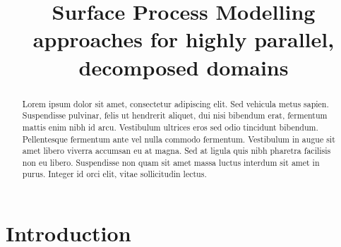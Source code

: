 \documentclass[draft,jgrga]{agu_template/AGUTeX}
\begin{document}

\title{Surface Process Modelling approaches for highly parallel, decomposed domains}











\begin{abstract}

Lorem ipsum dolor sit amet, consectetur adipiscing elit. Sed vehicula metus sapien. Suspendisse pulvinar, felis ut hendrerit aliquet, dui nisi bibendum erat, fermentum mattis enim nibh id arcu. Vestibulum ultrices eros sed odio tincidunt bibendum. Pellentesque fermentum ante vel nulla commodo fermentum. Vestibulum in augue sit amet libero viverra accumsan eu at magna. Sed at ligula quis nibh pharetra facilisis non eu libero. Suspendisse non quam sit amet massa luctus interdum sit amet in purus. Integer id orci elit, vitae sollicitudin lectus.

\end{abstract}

\section{Introduction}
\end{document}
